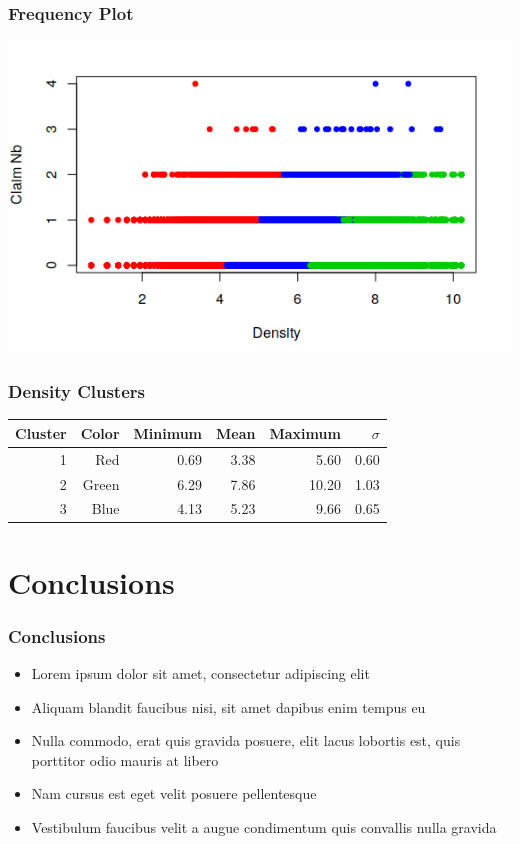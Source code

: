 \documentclass{beamer}
\begin{document}
\begin{frame}
\frametitle{Frequency Plot}
\begin{center}
\label{frequencyGraph}
\includegraphics[scale=0.80]{frequency.png}
\end{center}
\end{frame}


\begin{frame}
\frametitle{Density Clusters}
\begin{center}
\begin{tabular}{rrrrrr}
\hline
\hline
Cluster  & Color & Minimum & Mean & Maximum & $\sigma$  \\
\hline
1 &   Red         & 0.69    & 3.38 & 5.60    & 0.60  \\
2 &  Green       & 6.29    & 7.86 & 10.20   & 1.03  \\
3 &  Blue        & 4.13    & 5.23 & 9.66    & 0.65 \\
\hline\hline
\end{tabular}
\end{center}
\end{frame}



\section{Conclusions}

\begin{frame}
\frametitle{Conclusions}
\begin{itemize}
\item Lorem ipsum dolor sit amet, consectetur adipiscing elit
\item Aliquam blandit faucibus nisi, sit amet dapibus enim tempus eu
\item Nulla commodo, erat quis gravida posuere, elit lacus lobortis est, quis porttitor odio mauris at libero
\item Nam cursus est eget velit posuere pellentesque
\item Vestibulum faucibus velit a augue condimentum quis convallis nulla gravida
\end{itemize}
\end{frame}
\end{document}
